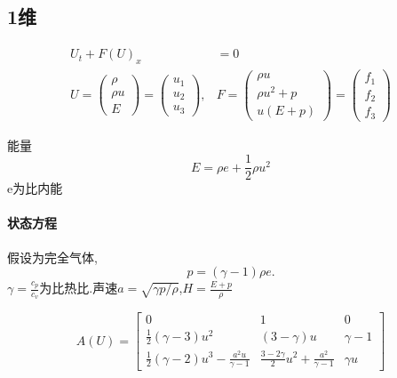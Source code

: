 \documentclass[UTF8]{ctexart}
\begin{document}
\subsection{1维}
\begin{equation*}
  \begin{split}
     U_t+F(U)_x&=0 \\
     U=\left( \begin{matrix}
                \rho \\
                \rho u \\
                E
              \end{matrix}\right)=\left( \begin{matrix}
                u_1\\
                 u_2 \\
                u_3
              \end{matrix}\right) , & F=\left( \begin{matrix}
                \rho u \\
                \rho u^2+p \\
                u(E+p)
              \end{matrix}\right) =\left( \begin{matrix}
                f_1\\
                 f_2 \\
                f_3
                \end{matrix}
                \right)
  \end{split}
\end{equation*}

能量$$ E=\rho e +\frac{1}{2}\rho u^2$$
e为比内能

\paragraph{状态方程}
假设为完全气体,$$p=(\gamma-1)\rho e.$$
  $\gamma=\frac{c_p}{c_v}$为比热比.声速$a=\sqrt{\gamma p/\rho}$,$H=\frac{E+p}{\rho}$

  \begin{equation*}
       A(U)=  \left[ \begin{matrix}
                        0 & 1 & 0 \\
                        \frac{1}{2}(\gamma-3)u^2 & (3-\gamma)u & \gamma-1 \\
                    \frac{1}{2}(\gamma-2)u^3-\frac{a^2u}{\gamma-1} & \frac{3-2\gamma}{2}u^2+\frac{a^2}{\gamma-1} & \gamma u
                      \end{matrix} \right]
  \end{equation*}
\end{document}
